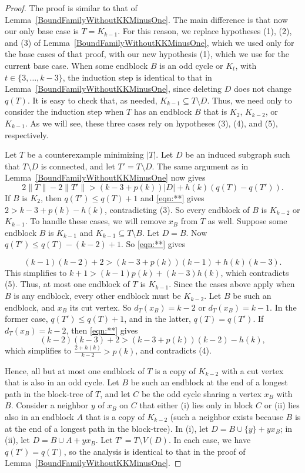 \documentclass[12pt]{article}
\theoremstyle{plain}
\theoremstyle{definition}
\theoremstyle{remark}
\newcommand{\card}[1]{\left|#1\right|}
\newcommand{\parens}[1]{\left( #1 \right)}
\begin{document}
\begin{proof}

The proof is similar to that of Lemma~\ref{BoundFamilyWithoutKKMinusOne}.  The
main difference is that now our only base case is $T=K_{k-1}$.  For this
reason, we replace hypotheses (1), (2), and (3) of
Lemma~\ref{BoundFamilyWithoutKKMinusOne}, which we used only for the base cases
of that proof, with our new hypothesis (1), which we use for the current base
case.  When some endblock $B$ is an odd cycle or $K_t$, with $t\in\{3, \ldots,
k-3\}$, the induction step is identical to that in
Lemma~\ref{BoundFamilyWithoutKKMinusOne}, since deleting $D$ does not change
$q(T)$.
It is easy to check that, as needed, $K_{k-1}\subseteq T\setminus D$.  Thus, we
need only to consider the induction step when $T$ has an endblock $B$ that is
$K_2$, $K_{k-2}$, or $K_{k-1}$.  As we will see, these three cases rely on
hypotheses (3), (4), and (5), respectively.
    
Let $T$ be a counterexample minimizing $|T|$.  Let $D$ be an induced subgraph
such that $T\setminus D$ is connected, and let $T'=T\setminus D$. The same
argument as in Lemma~\ref{BoundFamilyWithoutKKMinusOne} now gives
    \begin{equation}
		2\|T\|-2\|T'\| > (k-3 + p(k))\card{D} + h(k)\parens{q(T) -
q(T')}.\tag{**}\label{eqn:**}
	\end{equation}
If $B$ is $K_2$, then $q(T') \le q(T) + 1$ and \eqref{eqn:**} gives $2 > k-3 +
p(k) - h(k)$, contradicting (3).
So every endblock of $B$ is $K_{k-2}$ or $K_{k-1}$. To handle these cases, we
will remove $x_B$ from $T$ as well.  Suppose some endblock $B$ is
$K_{k-1}$ and $K_{k-1} \subseteq T\setminus B$.  Let $D=B$.  Now
$q(T') \le q(T)-(k-2)+1$.  So \eqref{eqn:**} gives
	
\[ (k-1)(k-2)+2 > (k-3+p(k))(k-1)+h(k)(k-3).\]
This simplifies to $k+1 > (k-1)p(k)+(k-3)h(k)$, which contradicts (5).  Thus,
at most one endblock of $T$ is $K_{k-1}$.
Since the cases above apply when $B$ is any endblock, every other endblock must
be $K_{k-2}$.  Let $B$ be such an endblock, and $x_B$ its cut vertex.	So
$d_T(x_{B}) = k - 2$ or $d_T(x_{B}) = k-1$.  In the former case, $q(T') \le
q(T) + 1$, and in the latter, $q(T) = q(T')$.
If $d_T(x_{B}) = k - 2$, then \eqref{eqn:**} gives
\[(k-2)(k-3) +2 > (k-3 + p(k))(k-2) - h(k),\]
which simplifies to $\frac{2+h(k)}{k-2} > p(k)$, and contradicts (4).
	
Hence, all but at most one endblock of $T$ is a copy of $K_{k-2}$ with a
cut vertex that is also in an odd cycle.  Let $B$ be such an endblock 
at the end of a longest path in the block-tree of $T$, and let $C$ be the odd
cycle sharing a vertex $x_B$ with $B$.  Consider a neighbor $y$ 
of $x_B$ on $C$ that either (i) lies only in block $C$ or (ii) lies also in an
endblock $A$ that is a copy of $K_{k-2}$ (such a neighbor exists 
because $B$ is at the end of a longest path in the block-tree).  In (i), let
$D=B\cup\{y\}+yx_B$; in (ii), let $D=B\cup A+yx_B$.  Let $T'=T\setminus
V(D)$.	In each case, we have $q(T')=q(T)$, so the analysis is identical to that
in the proof of Lemma~\ref{BoundFamilyWithoutKKMinusOne}.
\end{proof}
\end{document}
